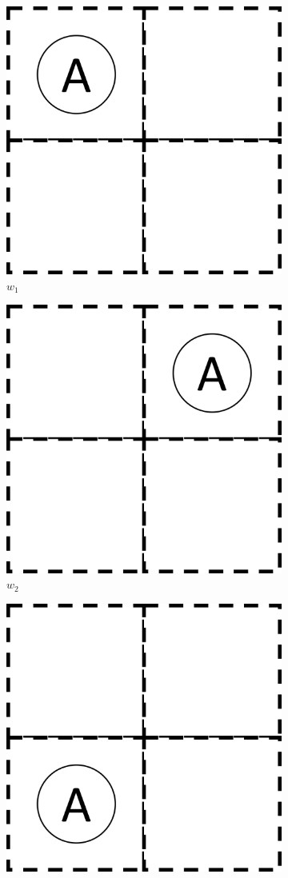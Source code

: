 \begin{figure}[H]
	\centering
	\begin{subfigure}[b]{0.45\linewidth}
		\centering
		\includegraphics[width=0.5\linewidth]{2MathematicalFramework/Images/2x2_no_walls_world_states/w0.png}
		\caption{$w_{1}$}
		\vspace{0.25cm}
	\end{subfigure}
	\begin{subfigure}[b]{0.45\linewidth}
		\centering
		\includegraphics[width=0.5\linewidth]{2MathematicalFramework/Images/2x2_no_walls_world_states/w1.png}
		\caption{$w_{2}$}
		\vspace{0.25cm}
	\end{subfigure}
	\begin{subfigure}[b]{0.45\linewidth}
		\centering
		\includegraphics[width=0.5\linewidth]{2MathematicalFramework/Images/2x2_no_walls_world_states/w2.png}

\end{subfigure}
\end{figure}
